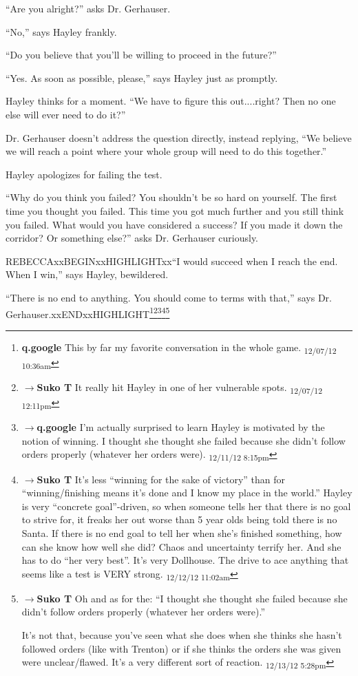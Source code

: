 ``Are you alright?'' asks Dr. Gerhauser.

``No,'' says Hayley frankly.

``Do you believe that you'll be willing to proceed in the future?''

``Yes.  As soon as possible, please,'' says Hayley just as promptly.



Hayley thinks for a moment.  ``We have to figure this out....right?  Then no one else will ever need to do it?''

Dr. Gerhauser doesn't address the question directly, instead replying, ``We believe we will reach a point where your whole group will need to do this together.''



Hayley apologizes for failing the test.  

``Why do you think you failed?  You shouldn't be so hard on yourself.  The first time you thought you failed.  This time you got much further and you still think you failed.  What would you have considered a success?  If you made it down the corridor?  Or something else?'' asks Dr. Gerhauser curiously.

REBECCAxxBEGINxxHIGHLIGHTxx``I would succeed when I reach the end.  When I win,'' says Hayley, bewildered.

``There is no end to anything.  You should come to terms with that,'' says Dr. Gerhauser.xxENDxxHIGHLIGHT\footnote{\textbf{q.google }This by far my favorite conversation in the whole game. \textsubscript{12/07/12 10:36am}}\footnote{$\rightarrow$\textbf{Suko T }It really hit Hayley in one of her vulnerable spots. \textsubscript{12/07/12 12:11pm}}\footnote{$\rightarrow$\textbf{q.google }I'm actually surprised to learn Hayley is motivated by the notion of winning.  I thought she thought she failed because she didn't follow orders properly (whatever her orders were). \textsubscript{12/11/12 8:15pm}}\footnote{$\rightarrow$\textbf{Suko T }It's less ``winning for the sake of victory'' than for ``winning/finishing means it's done and I know my place in the world.''  Hayley is very ``concrete goal''-driven, so when someone tells her that there is no goal to strive for, it freaks her out worse than 5 year olds being told there is no Santa.  If there is no end goal to tell her when she's finished something, how can she know how well she did? Chaos and uncertainty terrify her.  And she has to do ``her very best''.  It's very Dollhouse.  The drive to ace anything that seems like a test is VERY strong. \textsubscript{12/12/12 11:02am}}\footnote{$\rightarrow$\textbf{Suko T }Oh and as for the: ``I thought she thought she failed because she didn't follow orders properly (whatever her orders were).''  

It's not that, because you've seen what she does when she thinks she hasn't followed orders (like with Trenton) or if she thinks the orders she was given were unclear/flawed.  It's a very different sort of reaction. \textsubscript{12/13/12 5:28pm}}



